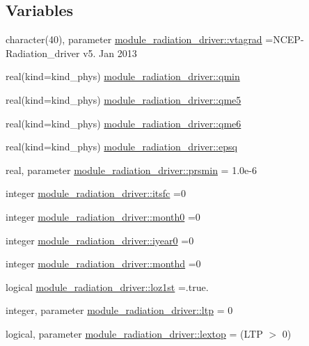 \subsection*{Variables}
\begin{DoxyCompactItemize}
\item 
character(40), parameter \hyperlink{namespacemodule__radiation__driver_a70a36595385cf1f5794f9c5859e52ab6}{module\+\_\+radiation\+\_\+driver\+::vtagrad} =\textquotesingle{}N\+C\+EP-\/Radiation\+\_\+driver v5. Jan 2013 \textquotesingle{}
\item 
real(kind=kind\+\_\+phys) \hyperlink{group__module__radiation__driver_gafdc2a7e1dbfb075ac33a2388564d9428}{module\+\_\+radiation\+\_\+driver\+::qmin}
\item 
real(kind=kind\+\_\+phys) \hyperlink{group__module__radiation__driver_gab671cb80142c71dab5f41f01ccdcc088}{module\+\_\+radiation\+\_\+driver\+::qme5}
\item 
real(kind=kind\+\_\+phys) \hyperlink{group__module__radiation__driver_ga4916e37c472b2f824b6f566ff67200cd}{module\+\_\+radiation\+\_\+driver\+::qme6}
\item 
real(kind=kind\+\_\+phys) \hyperlink{group__module__radiation__driver_ga0b0bf0fa8723b80d0891ec3327d187d7}{module\+\_\+radiation\+\_\+driver\+::epsq}
\item 
real, parameter \hyperlink{group__module__radiation__driver_ga3fc43ca0d2c5f69a380ddb4f0926ecc7}{module\+\_\+radiation\+\_\+driver\+::prsmin} = 1.\+0e-\/6
\item 
integer \hyperlink{group__module__radiation__driver_ga9ee6a89464bf206cc07ea30d7eeaaeb8}{module\+\_\+radiation\+\_\+driver\+::itsfc} =0
\item 
integer \hyperlink{group__module__radiation__driver_ga6eb268f296c77047f389ed6fac5f95be}{module\+\_\+radiation\+\_\+driver\+::month0} =0
\item 
integer \hyperlink{group__module__radiation__driver_ga4d755de48d0aa83f337a2a907ac7d8a2}{module\+\_\+radiation\+\_\+driver\+::iyear0} =0
\item 
integer \hyperlink{group__module__radiation__driver_gac4baf8ff048aaa5b85d03cc42c579c7b}{module\+\_\+radiation\+\_\+driver\+::monthd} =0
\item 
logical \hyperlink{group__module__radiation__driver_gaf6e0e1ef2ebb78f57c897ebaf633edd2}{module\+\_\+radiation\+\_\+driver\+::loz1st} =.true.
\item 
integer, parameter \hyperlink{group__module__radiation__driver_gaab2535e9906afd709124056f4ca1e470}{module\+\_\+radiation\+\_\+driver\+::ltp} = 0
\item 
logical, parameter \hyperlink{group__module__radiation__driver_gad27b36d0186c8147fe839eb5c268d157}{module\+\_\+radiation\+\_\+driver\+::lextop} = (L\+TP $>$ 0)
\end{DoxyCompactItemize}
